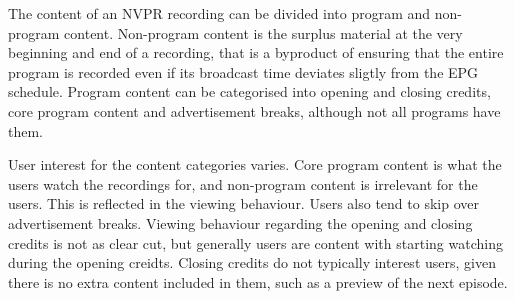 The content of an NVPR recording can be divided into program and non-program content. %
Non-program content is the surplus material at the very beginning and end of a recording, that is a byproduct of ensuring that the entire program is recorded even if its broadcast time deviates sligtly from the EPG schedule. Program content can be categorised into opening and closing credits, core program content and advertisement breaks, although not all programs have them.

User interest for the content categories varies. Core program content is what the users watch the recordings for, and non-program content is irrelevant for the users. This is reflected in the viewing behaviour. Users also tend to skip over advertisement breaks. Viewing behaviour regarding the opening and closing credits is not as clear cut, %
but generally users are content with starting watching during the opening creidts. Closing credits do not typically interest users, given there is no extra content included in them, such as a preview of the next episode. 


